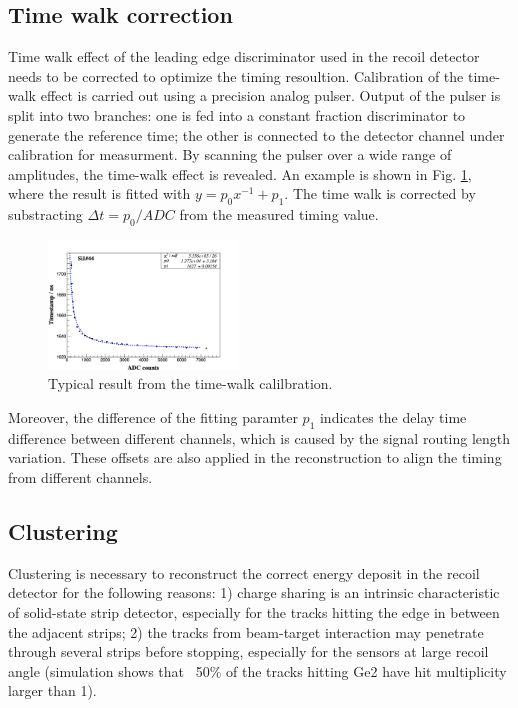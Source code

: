 \documentclass[number,5p]{elsarticle}
\begin{document}
\subsection{Time walk correction}
\label{sec:timewalk}

Time walk effect of the leading edge discriminator used in the recoil detector needs to be corrected to
optimize the timing resoultion.
Calibration of the time-walk effect is carried out using a  precision analog pulser. 
Output of the pulser is split into two branches: one is fed into a constant fraction discriminator to generate the reference time;
the other is connected to the detector channel under calibration for measurment. 
By scanning the pulser over a wide range of amplitudes, the time-walk effect is
revealed.
An example is shown in Fig. \ref{fig:timewalk}, where the result is fitted with \(y=p_0 x^{-1} + p_1\). 
The time walk is corrected by substracting \(\Delta t = p_0/ADC\) from the
measured timing value.

\begin{figure}[htbp]
  \centering
  \includegraphics[width=0.45\textwidth]{./timewalk.png}
  \caption{Typical result from the time-walk calilbration.}
  \label{fig:timewalk}
\end{figure}

Moreover, the difference of the fitting paramter \(p_1\) indicates the delay time
difference between different channels, which is caused by the signal routing length variation.
These offsets are also applied in the reconstruction to align the timing from different channels.

\subsection{Clustering}
\label{clustering}

Clustering is necessary to reconstruct the correct energy deposit in the
recoil detector for the following reasons: 1) charge sharing is an intrinsic characteristic of solid-state strip detector, especially
for the tracks hitting the edge in between the adjacent strips; 2) the tracks
from beam-target interaction may penetrate through several strips before
stopping, especially for the sensors at large recoil angle (simulation shows
that ~50\% of the tracks hitting Ge2 have hit multiplicity larger than 1).
\end{document}
